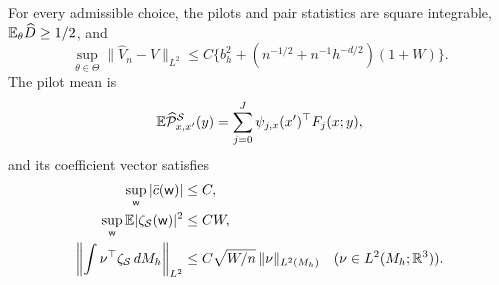 \begin{proposition}\label{lem:U7}\label{lem:U8}
For every admissible choice, the pilots and pair statistics are square
integrable, $\mathbb E_\theta\widehat D\ge1/2$, and
\begin{equation}\label{eq:U-master-risk}
 \sup_{\theta\in\Theta}\|\widehat V_n-V\|_{L^2}
 \le C\{b_h^2+(n^{-1/2}+n^{-1}h^{-d/2})(1+W)\}.
\end{equation}
The pilot mean is
\begin{equation}\label{eq:U7-mean}
 \mathbb E\widehat{\mathcal P}^{\mathcal S}_{x,x'}(y)
 =\sum_{j=0}^J\psi_{j,x}(x')^\top F_j(x;y),
\end{equation}
and its coefficient vector satisfies
\begin{align}
 \sup_{\mathsf w}|\bar c(\mathsf w)|&\le C,\label{eq:U7-meanbound}\\
 \sup_{\mathsf w}\mathbb E|\zeta_{\mathcal S}(\mathsf w)|^2&\le CW,
 \label{eq:U7-pointwise}\\
 \left\|\int\nu^\top\zeta_{\mathcal S}\,dM_h\right\|_{L^2}
 &\le C\sqrt{W/n}\,\|\nu\|_{L^2(M_h)}
 \quad(\nu\in L^2(M_h;\mathbb R^3)).\label{eq:U7-linear}
\end{align}
\end{proposition}

